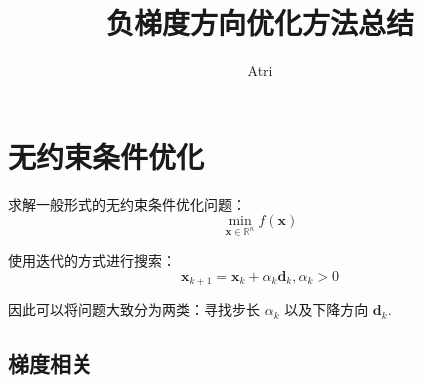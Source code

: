 \documentclass[lang = cn]{elegantpaper}
\title{负梯度方向优化方法总结}
\author{Atri}
\begin{document}
\maketitle

\section{无约束条件优化}

求解一般形式的无约束条件优化问题：
\begin{equation*}
    \min_{\bm{x}\in \mathbb{R}^n} f(\bm{x})
\end{equation*}

使用迭代的方式进行搜索：
\begin{equation*}
    \bm{x}_{k+1} = \bm{x}_k + \alpha_k\bm{d}_k, \alpha_k > 0
\end{equation*}

因此可以将问题大致分为两类：寻找步长 $\alpha_k$ 以及下降方向 $\bm{d}_k$.
\subsection{梯度相关}

\end{document}
